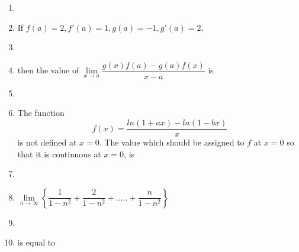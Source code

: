 \documentclass[journal,12pt,twocolumn]{IEEEtran}
\begin{document}
\begin{enumerate}
\item[~] \item If $f(a)\mathbin{=}2, f'(a)\mathbin{=}1, g(a)\mathbin{=}-1, g'(a)\mathbin{=}2$, \item[~]\item[~] then the value of $\lim\limits_{x \to a}\dfrac{g(x)f(a)-g(a)f(x)}{x-a}$ is
\begin{itemize}
\end{itemize}

\item[~] \item The function \[f(x)=\dfrac{ln(1+ax)-ln(1-bx)}{x}\] is not defined at $x\mathbin{=}0$. The value which should be assigned to $f$ at $x=0$ so that it is continuous at $x\mathbin{=}0$, is
\begin{itemize}
\end{itemize}

\item[~] \item$\lim\limits_{n \to \infty}\left\{\dfrac{1}{1-n^2}+\dfrac{2}{1-n^2}+.....+\dfrac{n}{1-n^2}\right\}$ \item[~] \item[~]is equal to
\begin{itemize}
\end{itemize}


\end{enumerate}
\end{document}

